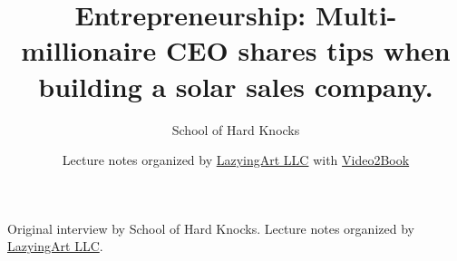 \documentclass[11pt,oneside]{book}
\begin{document}
\frontmatter
\title{Entrepreneurship: Multi-millionaire CEO shares tips when building a solar sales company.}
\author{School of Hard Knocks}
\date{Lecture notes organized by \href{https://lazying.art}{LazyingArt LLC} with \href{https://github.com/lachlanchen/Video2Book}{Video2Book}}
\maketitle
\begin{center}
\small Original interview by School of Hard Knocks. Lecture notes organized by \href{https://lazying.art}{LazyingArt LLC}.
\end{center}
\clearpage
\mainmatter

\end{document}
